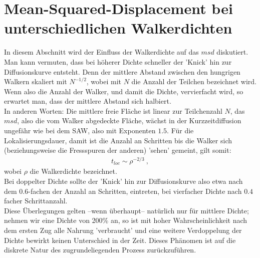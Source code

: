 \documentclass[a4paper, 12pt]{report}
\begin{document}
\section{Mean-Squared-Displacement bei unterschiedlichen Walkerdichten}  
In diesem Abschnitt wird der Einfluss der Walkerdichte auf das $msd$ diskutiert. 
\\
Man kann vermuten, dass bei höherer Dichte schneller der 'Knick' hin zur Diffusionskurve entsteht. Denn der mittlere Abstand zwischen den hungrigen Walkern skaliert mit $N^{-1/2}$, wobei mit $N$ die Anzahl der Teilchen bezeichnet wird. Wenn also die Anzahl der Walker, und damit die Dichte, vervierfacht wird, so erwartet man, dass der mittlere Abstand sich halbiert.
\\
In anderen Worten: Die mittlere freie Fläche ist linear zur Teilchenzahl $N$, das $msd$, also die vom Walker abgedeckte Fläche, wächst in der Kurzzeitdiffusion ungefähr wie bei dem SAW, also mit Exponenten $1.5$. Für die Lokalisierungsdauer, damit ist die Anzahl an Schritten bis die Walker sich (beziehungsweise die Fressspuren der anderen) 'sehen' gemeint, gilt somit:
\begin{align}
t_{loc} \sim \rho^{-2/3}\ ,
\end{align}
wobei $\rho$ die Walkerdichte bezeichnet.
\\
Bei doppelter Dichte sollte der 'Knick' hin zur Diffusionskurve also etwa nach dem $0.6$-fachen der Anzahl an Schritten, eintreten, bei vierfacher Dichte nach $0.4$ facher Schrittanzahl.
\\
Diese Überlegungen gelten --wenn überhaupt-- natürlich nur für mittlere Dichte; nehmen wir eine Dichte von 200\% an, so ist mit hoher Wahrscheinlichkeit nach dem ersten Zug alle Nahrung 'verbraucht' und eine weitere Verdoppelung der Dichte bewirkt keinen Unterschied in der Zeit. Dieses Phänomen ist auf die diskrete Natur des zugrundeliegenden Prozess zurückzuführen.
\end{document}
